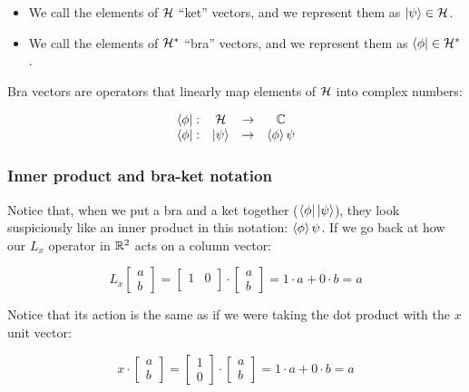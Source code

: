 \begin{itemize}
    \item We call the elements of $\mathcal{H}$ ``ket'' vectors, and we represent them as $\ket{\psi}\in\mathcal{H}$.
    \item We call the elements of $\mathcal{H}^*$ ``bra'' vectors, and we represent them as $\bra{\phi}\in\mathcal{H}^*$.
\end{itemize}

Bra vectors are operators that linearly map elements of $\mathcal{H}$ into complex numbers:

\begin{equation}
    \begin{matrix}
    \bra{\phi}: & \mathcal{H} & \rightarrow & \mathbb{C}\\
    \bra{\phi}: & \ket{\psi} & \rightarrow & \braket{\phi}{\psi}\\
    \end{matrix}
\end{equation}

\subsubsection{Inner product and bra-ket notation}

Notice that, when we put a bra and a ket together ($\bra{\phi}\ket{\psi}$), they look suspiciously like an inner product in this notation: $\braket{\phi}{\psi}$. If we go back at how our $L_x$ operator in $\mathbb{R}^2$ acts on a column vector:

\begin{equation}
    L_x\begin{bmatrix}
        a \\ b
    \end{bmatrix} =
    \begin{bmatrix}
        1 & 0 \\
    \end{bmatrix}\cdot
    \begin{bmatrix}
        a \\ b
    \end{bmatrix} = 1 \cdot a + 0\cdot b = a
\end{equation}

Notice that its action is the same as if we were taking the dot product with the $x$ unit vector:

\begin{equation}
    x\cdot\begin{bmatrix}
        a \\ b
    \end{bmatrix} = 
    \begin{bmatrix}
        1 \\ 0
    \end{bmatrix}\cdot
    \begin{bmatrix}
        a \\ b
    \end{bmatrix} = 1 \cdot a + 0\cdot b = a
\end{equation}

